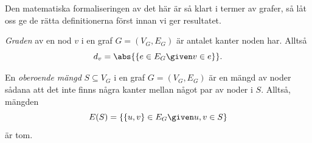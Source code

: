 \documentclass[nobib]{tufte-handout}
\begin{document}
Den matematiska formaliseringen av det här är så klart i termer av grafer, så låt oss ge de rätta definitionerna först innan vi ger resultatet.

\begin{definition}
    \emph{Graden} av en nod $v$ i en graf $G = (V_G, E_G)$ är antalet kanter noden har. Alltså
    $$d_v = \abs{\left\{e \in E_G \given v \in e\right\}}.$$
\end{definition}

\begin{definition}
    En \emph{oberoende mängd} $S \subseteq V_G$ i en graf $G = (V_G, E_G)$ är en mängd av noder sådana att det inte finns några kanter mellan något par av noder i $S$. Alltså, mängden
    $$E(S) = \left\{\{u,v\} \in E_G \given u, v \in S\right\}$$
    är tom.
\end{definition}
\end{document}
